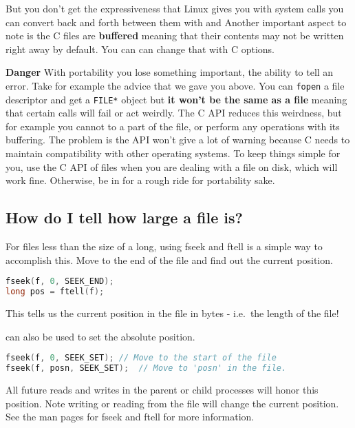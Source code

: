 But you don't get the expressiveness that Linux gives you with system calls you can convert back and forth between them with  and  Another important aspect to note is the C files are \textbf{buffered} meaning that their contents may not be written right away by default. You can can change that with C options.

\textbf{Danger} With portability you lose something important, the ability to tell an error. Take for example the advice that we gave you above. You can \texttt{fopen} a file descriptor and get a \texttt{FILE*} object but \textbf{it won't be the same as a file} meaning that certain calls will fail or act weirdly.
The C API reduces this weirdness, but for example you cannot  to a part of the file, or perform any operations with its buffering.
The problem is the API won't give a lot of warning because C needs to maintain compatibility with other operating systems.
To keep things simple for you, use the C API of files when you are dealing with a file on disk, which will work fine. Otherwise, be in for a rough ride for portability sake.

\subsection{How do I tell how large a file is?}

For files less than the size of a long, using fseek and ftell is a
simple way to accomplish this. Move to the end of the file and find out the current position.

\begin{lstlisting}[language=C]
fseek(f, 0, SEEK_END);
long pos = ftell(f);
\end{lstlisting}

This tells us the current position in the file in bytes - i.e.~the
length of the file!

 can also be used to set the absolute position.

\begin{lstlisting}[language=C]
fseek(f, 0, SEEK_SET); // Move to the start of the file
fseek(f, posn, SEEK_SET);  // Move to 'posn' in the file.
\end{lstlisting}

All future reads and writes in the parent or child processes will honor this position.
Note writing or reading from the file will change the current position.
See the man pages for fseek and ftell for more information.

